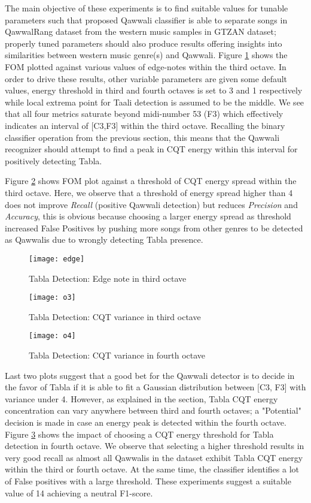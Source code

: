 \documentclass{article}
\begin{document}
The main objective of these experiments is to find suitable values for tunable parameters such that proposed Qawwali classifier is able to separate songs in QawwalRang dataset from the western music samples in GTZAN dataset; properly tuned parameters should also produce results offering insights into similarities between western music genre(s) and Qawwali. Figure \ref{fig:src_edge} shows the FOM plotted against various values of edge-notes within the third octave. In order to drive these results, other variable parameters are given some default values, energy threshold in third and fourth octaves is set to 3 and 1 respectively while local extrema point for Taali detection is assumed to be the middle.  We see that all four metrics saturate beyond midi-number 53 (F3) which effectively indicates an interval of [C3,F3] within the third octave. Recalling the binary classifier operation from the previous section, this means that the Qawwali recognizer should attempt to find a peak in CQT energy within this interval for positively detecting Tabla.

Figure \ref{fig:src_o3} shows FOM plot against a threshold of CQT energy spread within the third octave. Here, we observe that a threshold of energy spread higher than 4 does not improve \textit{Recall} (positive Qawwali detection) but reduces \textit{Precision} and \textit{Accuracy}, this is obvious because choosing a larger energy spread as threshold increased False Positives by pushing more songs from other genres to be detected as Qawwalis due to wrongly detecting Tabla presence.
\begin{figure}[htbp]
  \centering
  \texttt{[image: edge]}
  \caption{Tabla Detection: Edge note in third octave}
\label{fig:src_edge}
\end{figure}
\begin{figure}[htbp]
  \centering
  \texttt{[image: o3]}
  \caption{Tabla Detection: CQT variance in third octave}
\label{fig:src_o3}
\end{figure}
\begin{figure}[htbp]
  \centering
  \texttt{[image: o4]}
  \caption{Tabla Detection: CQT variance in fourth octave}
\label{fig:src_o4}
\end{figure}
Last two plots suggest that a good bet for the Qawwali detector is to decide in the favor of Tabla if it is able to fit a Gaussian distribution between [C3, F3] with variance under 4. However, as explained in the section, Tabla CQT energy concentration can vary anywhere between third and fourth octaves; a "Potential" decision is made in case an energy peak is detected within the fourth octave. Figure \ref{fig:src_o4} shows the impact of choosing a CQT energy threshold for Tabla detection in fourth octave. We observe that selecting a higher threshold results in very good recall as almost all Qawwalis in the dataset exhibit Tabla CQT energy within the third or fourth octave. At the same time, the classifier identifies a lot of False positives with a large threshold. These experiments suggest a suitable value of 14 achieving a neutral F1-score.
\end{document}
